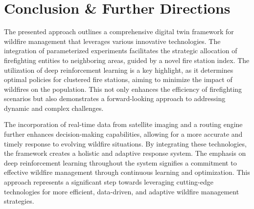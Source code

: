 \documentclass{scspaperproc}
\theoremstyle{scsthe}
\begin{document}
  


\section{Conclusion \& Further Directions}

The presented approach outlines a comprehensive digital twin framework for wildfire management that leverages various innovative technologies. The integration of parameterized experiments facilitates the strategic allocation of firefighting entities to neighboring areas, guided by a novel fire station index. The utilization of deep reinforcement learning is a key highlight, as it determines optimal policies for clustered fire stations, aiming to minimize the impact of wildfires on the population. This not only enhances the efficiency of firefighting scenarios but also demonstrates a forward-looking approach to addressing dynamic and complex challenges.

The incorporation of real-time data from satellite imaging and a routing engine further enhances decision-making capabilities, allowing for a more accurate and timely response to evolving wildfire situations. By integrating these technologies, the framework creates a holistic and adaptive response system. The emphasis on deep reinforcement learning throughout the system signifies a commitment to effective wildfire management through continuous learning and optimization. This approach represents a significant step towards leveraging cutting-edge technologies for more efficient, data-driven, and adaptive wildfire management strategies.




\end{document}

